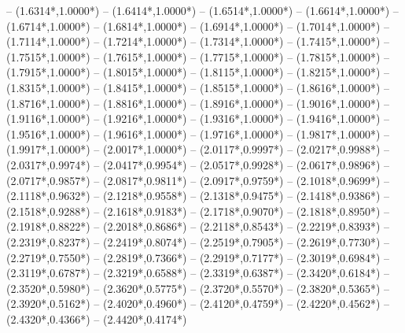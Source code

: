{	-- ({1.6314*\dx},{1.0000*\dy})
	-- ({1.6414*\dx},{1.0000*\dy})
	-- ({1.6514*\dx},{1.0000*\dy})
	-- ({1.6614*\dx},{1.0000*\dy})
	-- ({1.6714*\dx},{1.0000*\dy})
	-- ({1.6814*\dx},{1.0000*\dy})
	-- ({1.6914*\dx},{1.0000*\dy})
	-- ({1.7014*\dx},{1.0000*\dy})
	-- ({1.7114*\dx},{1.0000*\dy})
	-- ({1.7214*\dx},{1.0000*\dy})
	-- ({1.7314*\dx},{1.0000*\dy})
	-- ({1.7415*\dx},{1.0000*\dy})
	-- ({1.7515*\dx},{1.0000*\dy})
	-- ({1.7615*\dx},{1.0000*\dy})
	-- ({1.7715*\dx},{1.0000*\dy})
	-- ({1.7815*\dx},{1.0000*\dy})
	-- ({1.7915*\dx},{1.0000*\dy})
	-- ({1.8015*\dx},{1.0000*\dy})
	-- ({1.8115*\dx},{1.0000*\dy})
	-- ({1.8215*\dx},{1.0000*\dy})
	-- ({1.8315*\dx},{1.0000*\dy})
	-- ({1.8415*\dx},{1.0000*\dy})
	-- ({1.8515*\dx},{1.0000*\dy})
	-- ({1.8616*\dx},{1.0000*\dy})
	-- ({1.8716*\dx},{1.0000*\dy})
	-- ({1.8816*\dx},{1.0000*\dy})
	-- ({1.8916*\dx},{1.0000*\dy})
	-- ({1.9016*\dx},{1.0000*\dy})
	-- ({1.9116*\dx},{1.0000*\dy})
	-- ({1.9216*\dx},{1.0000*\dy})
	-- ({1.9316*\dx},{1.0000*\dy})
	-- ({1.9416*\dx},{1.0000*\dy})
	-- ({1.9516*\dx},{1.0000*\dy})
	-- ({1.9616*\dx},{1.0000*\dy})
	-- ({1.9716*\dx},{1.0000*\dy})
	-- ({1.9817*\dx},{1.0000*\dy})
	-- ({1.9917*\dx},{1.0000*\dy})
	-- ({2.0017*\dx},{1.0000*\dy})
	-- ({2.0117*\dx},{0.9997*\dy})
	-- ({2.0217*\dx},{0.9988*\dy})
	-- ({2.0317*\dx},{0.9974*\dy})
	-- ({2.0417*\dx},{0.9954*\dy})
	-- ({2.0517*\dx},{0.9928*\dy})
	-- ({2.0617*\dx},{0.9896*\dy})
	-- ({2.0717*\dx},{0.9857*\dy})
	-- ({2.0817*\dx},{0.9811*\dy})
	-- ({2.0917*\dx},{0.9759*\dy})
	-- ({2.1018*\dx},{0.9699*\dy})
	-- ({2.1118*\dx},{0.9632*\dy})
	-- ({2.1218*\dx},{0.9558*\dy})
	-- ({2.1318*\dx},{0.9475*\dy})
	-- ({2.1418*\dx},{0.9386*\dy})
	-- ({2.1518*\dx},{0.9288*\dy})
	-- ({2.1618*\dx},{0.9183*\dy})
	-- ({2.1718*\dx},{0.9070*\dy})
	-- ({2.1818*\dx},{0.8950*\dy})
	-- ({2.1918*\dx},{0.8822*\dy})
	-- ({2.2018*\dx},{0.8686*\dy})
	-- ({2.2118*\dx},{0.8543*\dy})
	-- ({2.2219*\dx},{0.8393*\dy})
	-- ({2.2319*\dx},{0.8237*\dy})
	-- ({2.2419*\dx},{0.8074*\dy})
	-- ({2.2519*\dx},{0.7905*\dy})
	-- ({2.2619*\dx},{0.7730*\dy})
	-- ({2.2719*\dx},{0.7550*\dy})
	-- ({2.2819*\dx},{0.7366*\dy})
	-- ({2.2919*\dx},{0.7177*\dy})
	-- ({2.3019*\dx},{0.6984*\dy})
	-- ({2.3119*\dx},{0.6787*\dy})
	-- ({2.3219*\dx},{0.6588*\dy})
	-- ({2.3319*\dx},{0.6387*\dy})
	-- ({2.3420*\dx},{0.6184*\dy})
	-- ({2.3520*\dx},{0.5980*\dy})
	-- ({2.3620*\dx},{0.5775*\dy})
	-- ({2.3720*\dx},{0.5570*\dy})
	-- ({2.3820*\dx},{0.5365*\dy})
	-- ({2.3920*\dx},{0.5162*\dy})
	-- ({2.4020*\dx},{0.4960*\dy})
	-- ({2.4120*\dx},{0.4759*\dy})
	-- ({2.4220*\dx},{0.4562*\dy})
	-- ({2.4320*\dx},{0.4366*\dy})
	-- ({2.4420*\dx},{0.4174*\dy})
}
